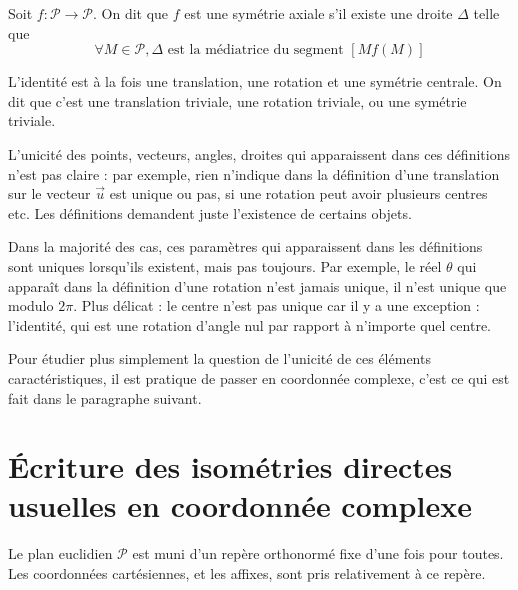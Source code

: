 \begin{definition}
Soit $f : \mathcal P\to \mathcal P$. On dit que $f$ est une symétrie axiale s'il existe une droite $\Delta$ telle que
\[ \forall M\in\mathcal P, \Delta \text{ est la médiatrice du segment } [Mf(M)]\]
\end{definition}

\begin{remarque}
L'identité est à la fois une translation, une rotation et une symétrie centrale. On dit que c'est une translation triviale, une rotation triviale, ou une symétrie triviale.
\end{remarque}



L'unicité des points, vecteurs, angles, droites qui apparaissent dans ces définitions n'est pas claire : par exemple, rien n'indique dans la définition d'une translation sur le vecteur $\vec u$ est unique ou pas, si une rotation peut avoir plusieurs centres etc. Les définitions demandent juste l'existence de certains objets.

Dans la majorité des cas, ces paramètres qui apparaissent dans les définitions sont uniques lorsqu'ils existent, mais pas toujours. Par exemple, le réel $\theta$ qui apparaît dans la définition d'une rotation n'est jamais unique, il n'est unique que modulo $2\pi$. Plus délicat : le centre n'est pas unique car il y a une exception : l'identité, qui est une rotation d'angle nul par rapport à n'importe quel \og centre\fg. 

Pour étudier plus simplement la question de l'unicité de ces \og éléments caractéristiques\fg, il est pratique de passer en coordonnée complexe, c'est ce qui est fait dans le paragraphe suivant.

\section{Écriture des isométries directes usuelles en coordonnée complexe}

Le plan euclidien $\mathcal P$ est muni d'un repère orthonormé fixe d'une fois pour toutes. Les coordonnées cartésiennes, et les affixes, sont pris relativement à ce repère.


